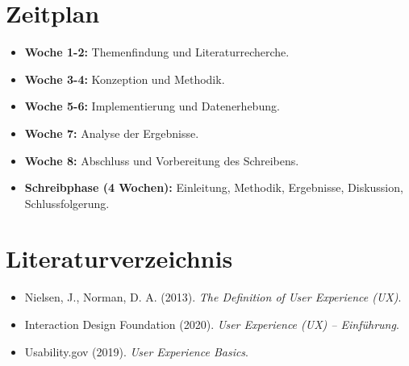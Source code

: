 \documentclass[a4paper,12pt]{report}
\begin{document}
\section*{Zeitplan}
\begin{itemize}
    \item \textbf{Woche 1-2:} Themenfindung und Literaturrecherche.
    \item \textbf{Woche 3-4:} Konzeption und Methodik.
    \item \textbf{Woche 5-6:} Implementierung und Datenerhebung.
    \item \textbf{Woche 7:} Analyse der Ergebnisse.
    \item \textbf{Woche 8:} Abschluss und Vorbereitung des Schreibens.
    \item \textbf{Schreibphase (4 Wochen):} Einleitung, Methodik, Ergebnisse, Diskussion, Schlussfolgerung.
\end{itemize}

\section*{Literaturverzeichnis}
\begin{itemize}
    \item Nielsen, J., Norman, D. A. (2013). \textit{The Definition of User Experience (UX)}.
    \item Interaction Design Foundation (2020). \textit{User Experience (UX) – Einführung}.
    \item Usability.gov (2019). \textit{User Experience Basics}.
\end{itemize}
\end{document}
